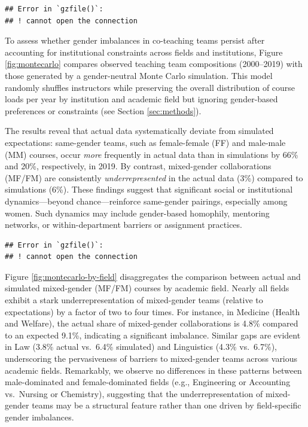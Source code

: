 \documentclass[
  british,
  11pt,
]{article}
\begin{document}
\begin{verbatim}
## Error in `gzfile()`:
## ! cannot open the connection
\end{verbatim}

To assess whether gender imbalances in co-teaching teams persist after accounting for institutional constraints across fields and institutions, Figure \ref{fig:montecarlo} compares observed teaching team compositions (2000--2019) with those generated by a gender-neutral Monte Carlo simulation. This model randomly shuffles instructors while preserving the overall distribution of course loads per year by institution and academic field but ignoring gender-based preferences or constraints (see Section \ref{sec:methods}).

The results reveal that actual data systematically deviate from simulated expectations: same-gender teams, such as female-female (FF) and male-male (MM) courses, occur \emph{more} frequently in actual data than in simulations by 66\% and 20\%, respectively, in 2019. By contrast, mixed-gender collaborations (MF/FM) are consistently \emph{underrepresented} in the actual data (3\%) compared to simulations (6\%). These findings suggest that significant social or institutional dynamics---beyond chance---reinforce same-gender pairings, especially among women. Such dynamics may include gender-based homophily, mentoring networks, or within-department barriers or assignment practices.

\begin{verbatim}
## Error in `gzfile()`:
## ! cannot open the connection
\end{verbatim}

Figure \ref{fig:montecarlo-by-field} disaggregates the comparison between actual and simulated mixed-gender (MF/FM) courses by academic field. Nearly all fields exhibit a stark underrepresentation of mixed-gender teams (relative to expectations) by a factor of two to four times. For instance, in Medicine (Health and Welfare), the actual share of mixed-gender collaborations is 4.8\% compared to an expected 9.1\%, indicating a significant imbalance. Similar gaps are evident in Law (3.8\% actual vs.~6.4\% simulated) and Linguistics (4.3\% vs.~6.7\%), underscoring the pervasiveness of barriers to mixed-gender teams across various academic fields. Remarkably, we observe no differences in these patterns between male-dominated and female-dominated fields (e.g., Engineering or Accounting vs.~Nursing or Chemistry), suggesting that the underrepresentation of mixed-gender teams may be a structural feature rather than one driven by field-specific gender imbalances.
\end{document}
